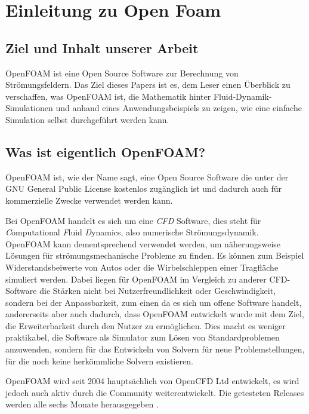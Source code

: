 %
%
%
%
\section{Einleitung zu Open Foam\label{openfoam:section:Einleitung}}

\subsection{Ziel und Inhalt unserer Arbeit}
OpenFOAM ist eine Open Source Software zur Berechnung von Strömungsfeldern. 
Das Ziel dieses Papers ist es, dem Leser einen Überblick zu verschaffen, was OpenFOAM ist, die Mathematik hinter Fluid-Dynamik-Simulationen und anhand eines 
Anwendungsbeispiels zu zeigen, wie eine einfache Simulation selbst durchgeführt werden kann.


\subsection{Was ist eigentlich OpenFOAM?\label{openfoam:section:WasIstOpenFoam}}
OpenFOAM ist, wie der Name sagt, eine Open Source Software die unter der GNU
General Public License kostenlos zugänglich ist und dadurch auch für kommerzielle Zwecke 
verwendet werden kann. 

Bei OpenFOAM handelt es sich um eine \emph{CFD} Software, dies steht für \emph{C}omputational \emph{F}luid \emph{D}ynamics, also numerische Strömungsdynamik.
OpenFOAM kann dementsprechend verwendet werden, um näherungsweise Lösungen für 
strömungsmechanische Probleme zu finden.
Es können zum Beispiel Widerstandsbeiwerte von Autos oder die Wirbelschleppen einer Tragfläche simuliert werden.
Dabei liegen für OpenFOAM im Vergleich zu anderer CFD-Software die Stärken nicht bei Nutzerfreundlichkeit oder Geschwindigkeit, sondern bei der Anpassbarkeit, zum einen da es sich um offene Software handelt, andererseits aber auch dadurch, dass OpenFOAM entwickelt wurde mit dem Ziel, die Erweiterbarkeit durch den Nutzer zu ermöglichen.
Dies macht es weniger praktikabel, die Software als Simulator zum Lösen von Standardproblemen anzuwenden, sondern für das Entwickeln von Solvern für neue Problemstellungen, für die noch keine herkömmliche Solvern existieren.

OpenFOAM wird seit 2004 hauptsächlich von OpenCFD Ltd entwickelt, es wird jedoch auch aktiv durch die Community weiterentwickelt.
Die getesteten Releases werden alle sechs Monate herausgegeben \cite{openfoam:greenshieldsweller2022}.

